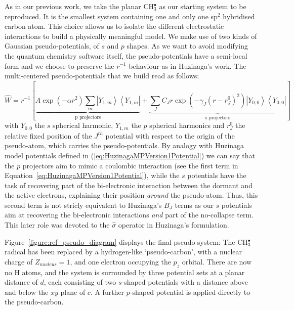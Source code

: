 \documentclass[12pt]{article}
\begin{document}
As in our previous work,\cite{drujon_pseudopotentials_2013}
we take the planar CH\(^{\bullet}_{3}\) as our starting system to be reproduced.
It is the smallest system containing one and only one sp$^2$ hybridised carbon atom. This choice allows us to isolate the different electrostatic interactions to build a physically meaningful model. We make use of two kinds of Gaussian pseudo-potentials,\cite{me_structure_theory} of \(s\) and \(p\) shapes. As we want to avoid modifying the quantum chemistry software itself, the pseudo-potentials have a semi-local form and we choose to preserve the \(r^{-1}\) behaviour as in Huzinaga's work.
The multi-centered pseudo-potentials that we build read as follows:
\begin{equation}
\label{eq:ourPP}
\hat{W} = r^{-1}\left[%
\underbrace{A\exp(-\alpha r^2)\sum_m\left|Y_{1,m}\right>\left<Y_{1,m}\right|}_{\text{p projectors}}%
+%
\underbrace{\sum_JC_Jr\exp(-\gamma_J (r-r^0_J)^2)\left|Y_{0,0}\right>\left<Y_{0,0}\right|}_{\text{s projectors}}%
\right]
\end{equation}
with $Y_{0,0}$ the $s$ spherical harmonic, $Y_{1,m}$ the $p$ spherical harmonics and $r^0_J$ the relative fixed position of the $J^{th}$ potential with respect to the origin of the pseudo-atom, which carries the pseudo-potentials.
By analogy with Huzinaga model potentials defined in (\ref{eq:HuzinagaMPVersion1Potential})
we can say that the $p$ projectors aim to mimic a coulombic interaction (see the first term in Equation~\ref{eq:HuzinagaMPVersion1Potential}),
while the $s$ potentials have the task of recovering part of the bi-electronic interaction
between the dormant and the active electrons, explaining their position \textit{around} the pseudo-atom.
Thus, this second term is not stricly equivalent to Huzinaga's $B_J$ terms as our $s$ potentials aim at recovering
the bi-electronic interactions \textit{and} part of the no-collapse term.
This later role was devoted to the $\hat{\sigma}$ operator in Huzinaga's formulation.

Figure~\ref{figure:ref_pseudo_diagram} displays the final pseudo-system: The CH\(^{\bullet}_{3}\) radical has been replaced by a hydrogen-like `pseudo-carbon', with a nuclear charge of \(Z_{nucleus} = 1\), and one electron occupying the \(p_{z}\) orbital. 
There are now no H atoms, and the system is surrounded by three potential sets at a planar distance of \(d\), each consisting of 
two \(s\)-shaped potentials with a distance above and below the \(xy\) plane of \(c\). A further \(p\)-shaped potential is applied
directly to the pseudo-carbon.
\end{document}

